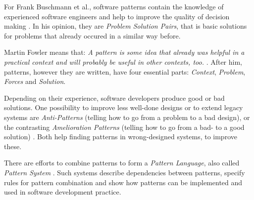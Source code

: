 For Frank Buschmann et al., software patterns contain the knowledge of
experienced software engineers and help to improve the quality of decision
making \cite{buschmann}. In his opinion, they are \emph{Problem Solution Pairs},
that is basic solutions for problems that already occured in a similar way before.

Martin Fowler means that: \textit{A pattern is some idea that already was
helpful in a practical context and will probably be useful in other contexts,
too.} \cite{fowler1997}. After him, patterns, however they are written, have
four essential parts: \emph{Context}, \emph{Problem}, \emph{Forces} and
\emph{Solution}.

Depending on their experience, software developers produce good or bad solutions.
One possibility to improve less well-done designs or to extend legacy systems
are \emph{Anti-Patterns} (telling how to go from a problem to a bad design),
or the contrasting \emph{Amelioration Patterns} (telling how to go from a bad-
to a good solution) \cite{portland}. Both help finding patterns in wrong-designed
systems, to improve these.

There are efforts to combine patterns to form a \emph{Pattern Language}, also
called \emph{Pattern System} \cite{buschmann}. Such systems describe
dependencies between patterns, specify rules for pattern combination and show
how patterns can be implemented and used in software development practice.
